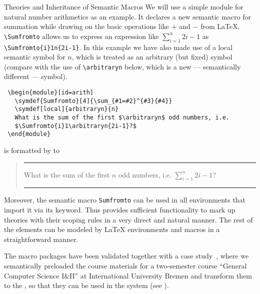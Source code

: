 \begin{omgroup}[id=stex,creators=miko]
\begin{omgroup}{Theories and Inheritance of Semantic Macros}
We will use a simple module for natural number arithmetics as an example. It declares a
new semantic macro for summation while drawing on the basic operations like $+$ and $-$
from {\LaTeX}.  {\verb|\Sumfromto|} allows us to express an expression like $\sum_{i=1}^n
2i-1$ as {\verb|\Sumfromto{i}1n{2i-1}|}. In this example we have also made use of a local
semantic symbol for $n$, which is treated as an arbitrary (but fixed) symbol (compare with
the use of {\verb|\arbitraryn|} below, which is a new --- semantically different ---
symbol).
\begin{lstlisting}
 \begin{module}[id=arith]
   \symdef{Sumfromto}[4]{\sum_{#1=#2}^{#3}{#4}}
   \symdef[local]{arbitraryn}{n}
   What is the sum of the first $\arbitraryn$ odd numbers, i.e.
   $\Sumfromto{i}1\arbitraryn{2i-1}?$
 \end{module}
\end{lstlisting}
is formatted by {\sTeX} to
\begin{quote}\hrule
  What is the sum of the first $n$ odd numbers, i.e.  $\sum_{i=1}^n{2i-1}$?\hrule
\end{quote}
Moreover, the semantic macro {\verb|Sumfromto|} can be used in all {}
environments that import it via its {} keyword. Thus {\stex} provides
sufficient functionality to mark up {\omdoc} theories with their scoping rules in a very
direct and natural manner. The rest of the {\omdoc} elements can be modeled by {\LaTeX}
environments and macros in a straightforward manner.

The {\stex} macro packages have been validated together with a case
study~\cite{Kohlhase:smtl05}, where we semantically preloaded the course materials for a
two-semester course ``General Computer Science I\&II'' at International University Bremen
and transform them to the {\omdoc}, so that they can be used in the {\activemath} system
(see {}).
\end{omgroup}
\end{omgroup}

